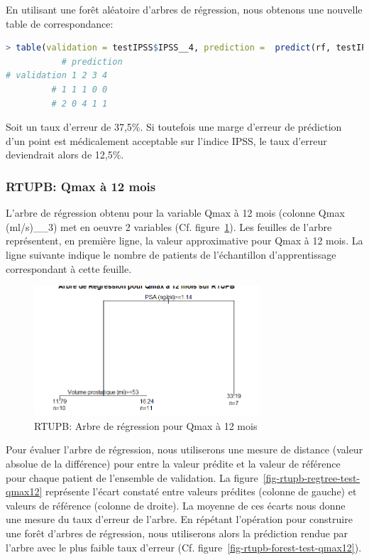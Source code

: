 En utilisant une forêt aléatoire d'arbres de régression, nous obtenons une nouvelle table de correspondance:
\begin{lstlisting}[language=R]
> table(validation = testIPSS$IPSS__4, prediction =  predict(rf, testIPSS))
           # prediction
# validation 1 2 3 4
         # 1 1 1 0 0
         # 2 0 4 1 1
\end{lstlisting}
Soit un taux d'erreur de 37,5\%. Si toutefois une marge d'erreur de prédiction d'un point est médicalement acceptable sur l'indice IPSS, le taux d'erreur deviendrait alors de 12,5\%.

\subsubsection{RTUPB: Qmax à 12 mois}

L'arbre de régression obtenu pour la variable Qmax à 12 mois (colonne Qmax (ml/s)\_\_3) met en oeuvre 2 variables (Cf. figure~\ref{fig-rtupb-regtree-qmax12}). Les feuilles de l'arbre représentent, en première ligne, la valeur approximative pour Qmax à 12 mois. La ligne suivante indique le nombre de patients de l'échantillon d'apprentissage correspondant à cette feuille. 

\begin{figure}[H]
\centering
\includegraphics[width=0.75\textwidth]{../Fig/RTUPB/rtupb-regtree-qmax12.png}
\caption{RTUPB: Arbre de régression pour Qmax à 12 mois}
\label{fig-rtupb-regtree-qmax12}
\end{figure}

Pour évaluer l'arbre de régression, nous utiliserons une mesure de distance (valeur absolue de la différence) pour entre la valeur prédite et la valeur de référence pour chaque patient de l'ensemble de validation. 
La figure~\ref{fig-rtupb-regtree-test-qmax12} représente l'écart constaté entre valeurs prédites (colonne de gauche) et valeurs de référence (colonne de droite). La moyenne de ces écarts nous donne une mesure du taux d'erreur de l'arbre. En répétant l'opération pour construire une forêt d'arbres de régression, nous utiliserons alors la prédiction rendue par l'arbre avec le plus faible taux d'erreur (Cf. figure~\ref{fig-rtupb-forest-test-qmax12}).

